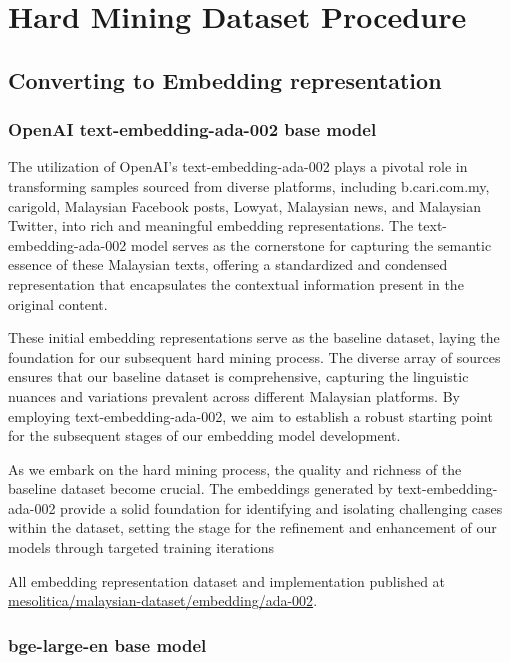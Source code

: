 \documentclass[preprint]{article}
\begin{document}
\section{Hard Mining Dataset Procedure}

\subsection{Converting to Embedding representation}

\subsubsection{OpenAI text-embedding-ada-002 base model}

The utilization of OpenAI's text-embedding-ada-002 plays a pivotal role in transforming samples sourced from diverse platforms, including b.cari.com.my, carigold, Malaysian Facebook posts, Lowyat, Malaysian news, and Malaysian Twitter, into rich and meaningful embedding representations. The text-embedding-ada-002 model serves as the cornerstone for capturing the semantic essence of these Malaysian texts, offering a standardized and condensed representation that encapsulates the contextual information present in the original content.

These initial embedding representations serve as the baseline dataset, laying the foundation for our subsequent hard mining process. The diverse array of sources ensures that our baseline dataset is comprehensive, capturing the linguistic nuances and variations prevalent across different Malaysian platforms. By employing text-embedding-ada-002, we aim to establish a robust starting point for the subsequent stages of our embedding model development.

As we embark on the hard mining process, the quality and richness of the baseline dataset become crucial. The embeddings generated by text-embedding-ada-002 provide a solid foundation for identifying and isolating challenging cases within the dataset, setting the stage for the refinement and enhancement of our models through targeted training iterations

All embedding representation dataset and implementation published at \href{https://github.com/mesolitica/malaysian-dataset/tree/master/embedding/ada-002}{mesolitica/malaysian-dataset/embedding/ada-002}.

\subsubsection{bge-large-en base model}
\end{document}
